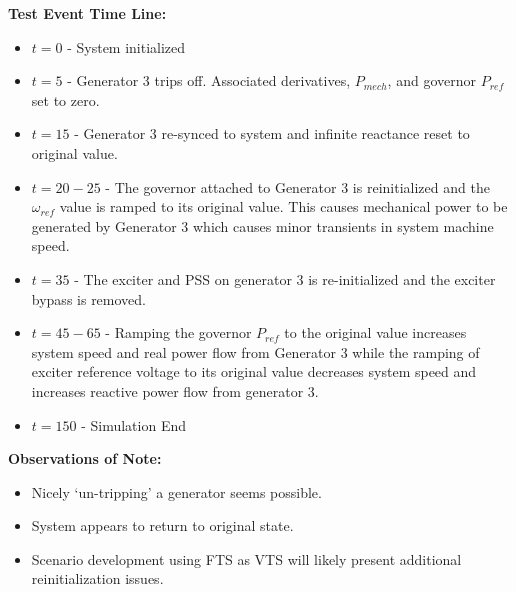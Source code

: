 \textbf{Test Event Time Line:}
\begin{itemize}
 em
\item $t=0$ - System initialized
\item $t=5$ - Generator 3 trips off.
Associated derivatives, $P_{mech}$, and governor $P_{ref}$ set to zero.
\item $t=15$ - Generator 3 re-synced to system and infinite reactance reset to original value. 

\item $t=20-25$ - The governor attached to Generator 3 is reinitialized and the $\omega_{ref}$ value is ramped to its original value. 
This causes mechanical power to be generated by Generator 3 which causes minor transients in system machine speed.
\item $t=35$ - The exciter and PSS on generator 3 is re-initialized and the exciter bypass is removed.
\item $t=45-65$ - Ramping the governor $P_{ref}$ to the original value increases system speed  and real power flow from Generator 3 while the ramping of exciter reference voltage to its original value decreases system speed and increases reactive power flow from generator 3.
\item $t=150$ - Simulation End
\end{itemize}

\textbf{Observations of Note:}
\begin{itemize}
 em
\item Nicely `un-tripping' a generator seems possible.
\item System appears to return to original state.
\item Scenario development using FTS as VTS will likely present additional reinitialization issues.
\end{itemize}

